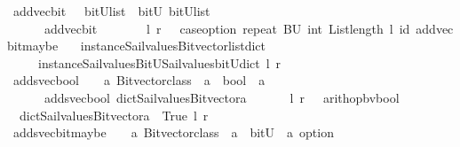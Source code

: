 \begin{isabellebody}
\isanewline
{}\isamarkupfalse%
\ add{\isacharunderscore}vec{\isacharunderscore}bit\ \ {\isacharcolon}{\isacharcolon}\ {\isachardoublequoteopen}{\isacharparenleft}bitU{\isacharparenright}list\ {\isasymRightarrow}\ bitU\ {\isasymRightarrow}{\isacharparenleft}bitU{\isacharparenright}list\ {\isachardoublequoteclose}\ \ \ \isanewline
\ \ \ \ \ {\isachardoublequoteopen}\ add{\isacharunderscore}vec{\isacharunderscore}bit\ \ \ \ \ \ \ \ l\ r\ {\isacharequal}\ {\isacharparenleft}\ case{\isacharunderscore}option\ {\isacharparenleft}repeat\ {\isacharbrackleft}BU{\isacharbrackright}\ {\isacharparenleft}int\ {\isacharparenleft}List{\isachardot}length\ l{\isacharparenright}{\isacharparenright}{\isacharparenright}\ id\ {\isacharparenleft}add{\isacharunderscore}vec{\isacharunderscore}bit{\isacharunderscore}maybe\ \isanewline
\ \ {\isacharparenleft}instance{\isacharunderscore}Sail{}{\isacharunderscore}values{\isacharunderscore}Bitvector{\isacharunderscore}list{\isacharunderscore}dict\isanewline
\ \ \ \ \ instance{\isacharunderscore}Sail{}{\isacharunderscore}values{\isacharunderscore}BitU{\isacharunderscore}Sail{}{\isacharunderscore}values{\isacharunderscore}bitU{\isacharunderscore}dict{\isacharparenright}\ l\ r{\isacharparenright}{\isacharparenright}{\isachardoublequoteclose}\isanewline
\isanewline
\isanewline
{}\isamarkupfalse%
\ adds{\isacharunderscore}vec{\isacharunderscore}bool\ \ {\isacharcolon}{\isacharcolon}\ {\isachardoublequoteopen}\ {\isacharprime}a\ Bitvector{\isacharunderscore}class\ {\isasymRightarrow}\ {\isacharprime}a\ {\isasymRightarrow}\ bool\ {\isasymRightarrow}\ {\isacharprime}a\ {\isachardoublequoteclose}\ \ \ \isanewline
\ \ \ \ \ {\isachardoublequoteopen}\ adds{\isacharunderscore}vec{\isacharunderscore}bool\ dict{\isacharunderscore}Sail{}{\isacharunderscore}values{\isacharunderscore}Bitvector{\isacharunderscore}a\ \ \ \ \ \ \ l\ r\ {\isacharequal}\ {\isacharparenleft}\ arith{\isacharunderscore}op{\isacharunderscore}bv{\isacharunderscore}bool\ \isanewline
\ \ dict{\isacharunderscore}Sail{}{\isacharunderscore}values{\isacharunderscore}Bitvector{\isacharunderscore}a\ {\isacharparenleft}{\isacharplus}{\isacharparenright}\ True\ l\ r\ {\isacharparenright}{\isachardoublequoteclose}\isanewline
\isanewline
{}\isamarkupfalse%
\ adds{\isacharunderscore}vec{\isacharunderscore}bit{\isacharunderscore}maybe\ \ {\isacharcolon}{\isacharcolon}\ {\isachardoublequoteopen}\ {\isacharprime}a\ Bitvector{\isacharunderscore}class\ {\isasymRightarrow}\ {\isacharprime}a\ {\isasymRightarrow}\ bitU\ {\isasymRightarrow}\ {\isacharprime}a\ option\ {\isachardoublequoteclose}\ \ \ \isanewline

\end{isabellebody}
